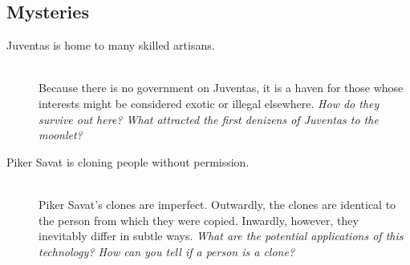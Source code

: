 \documentclass[11pt, a5paper, parskip=half-, DIV=12]{scrartcl}
\begin{document}
\subsection*{Mysteries}
\begin{description}
	\item[Juventas is home to many skilled artisans.] \phantom{} \\ Because there is no government on Juventas, it is a haven for those whose interests might be considered exotic or illegal elsewhere. \textit{How do they survive out here? What attracted the first denizens of Juventas to the moonlet?}
	\item[Piker Savat is cloning people without permission.] \phantom{} \\
	Piker Savat's clones are imperfect. Outwardly, the clones are identical to the person from which they were copied. Inwardly, however, they inevitably differ in subtle ways. \textit{What are the potential applications of this technology? How can you tell if a person is a clone?}
\end{description}

\newpage



\newpage

\thispagestyle{empty}
\end{document}
